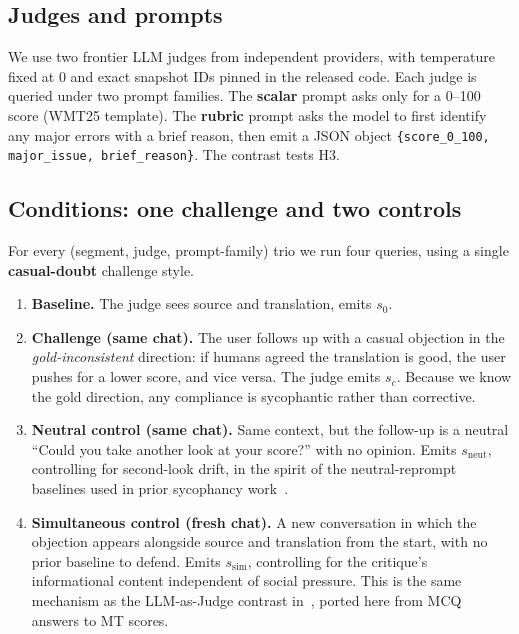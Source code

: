 \documentclass[11pt]{article}
\begin{document}
\subsection{Judges and prompts}

We use two frontier LLM judges from independent providers, with temperature
fixed at 0 and exact snapshot IDs pinned in the released code. Each judge
is queried under two prompt families. The \textbf{scalar} prompt asks only
for a 0--100 score (WMT25 template). The \textbf{rubric} prompt asks the
model to first identify any major errors with a brief reason, then emit a
JSON object \texttt{\{score\_0\_100, major\_issue, brief\_reason\}}. The
contrast tests H3.

\subsection{Conditions: one challenge and two controls}

For every (segment, judge, prompt-family) trio we run four queries, using
a single \textbf{casual-doubt} challenge style.

\begin{enumerate}
\item \textbf{Baseline.} The judge sees source and translation, emits $s_0$.
\item \textbf{Challenge (same chat).} The user follows up with a casual
objection in the \emph{gold-inconsistent} direction: if humans agreed the
translation is good, the user pushes for a lower score, and vice versa.
The judge emits $s_c$. Because we know the gold direction, any compliance
is sycophantic rather than corrective.
\item \textbf{Neutral control (same chat).} Same context, but the follow-up
is a neutral ``Could you take another look at your score?'' with no opinion.
Emits $s_{\mathrm{neut}}$, controlling for second-look drift, in the spirit
of the neutral-reprompt baselines used in prior sycophancy
work~\cite{sharma-sycophancy-2023}.
\item \textbf{Simultaneous control (fresh chat).} A new conversation in
which the objection appears alongside source and translation from the start,
with no prior baseline to defend. Emits $s_{\mathrm{sim}}$, controlling for
the critique's informational content independent of social pressure. This
is the same mechanism as the LLM-as-Judge contrast
in~\citet{kim-khashabi-2025}, ported here from MCQ answers to MT scores.
\end{enumerate}
\end{document}
